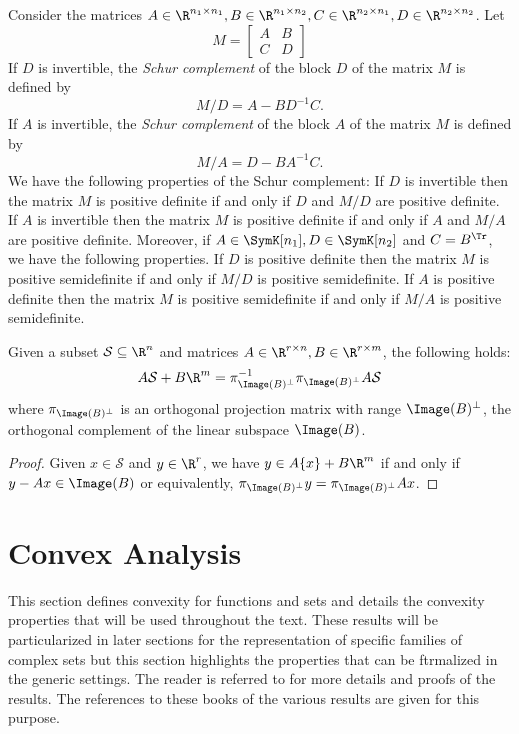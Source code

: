 \documentclass[11pt,twoside,a4paper,openright]{uclouvain-thesis}
\newcommand{\piB}{\pi_{\Image(B)^\perp}}
\newcommand{\piBinv}{\pi_{\Image(B)^\perp}^{-1}}
\begin{document}
\begin{myprop}
  \label{prop:schurcomp}
  Consider the matrices $A \in \R^{n_1 \times n_1},
  B \in \R^{n_1 \times n_2}, C \in \R^{n_2 \times n_1},
  D \in \R^{n_2 \times n_2}$.
  Let
  \[
    M = \begin{bmatrix}
      A & B\\
      C & D
    \end{bmatrix}
  \]
  If $D$ is invertible, the \emph{Schur complement} of the block $D$ of the matrix $M$ is defined by
  \[ M/D = A - B D^{-1} C. \]
  If $A$ is invertible, the \emph{Schur complement} of the block $A$ of the matrix $M$ is defined by
  \[ M/A = D - B A^{-1} C. \]
  We have the following properties of the Schur complement:
  If $D$ is invertible then the matrix $M$ is positive definite if and only if $D$ and $M/D$ are
  positive definite.
  If $A$ is invertible then the matrix $M$ is positive definite if and only if $A$ and $M/A$ are
  positive definite.
  Moreover, if $A \in \SymK[n_1], D \in \SymK[n_2]$ and $C = B^\Tr$,
  we have the following properties.
  If $D$ is positive definite then the matrix $M$ is positive semidefinite if and only if $M/D$ is
  positive semidefinite.
  If $A$ is positive definite then the matrix $M$ is positive semidefinite if and only if $M/A$ is
  positive semidefinite.
\end{myprop}

\begin{myprop}
  \label{prop:projB}
  Given a subset $\mathcal{S} \subseteq \R^n$ and
  matrices $A \in \R^{r \times n}, B \in \R^{r \times m}$, the following holds:
  \[ A \mathcal{S} + B \R^m = \piBinv{} \piB{} A \mathcal{S} \]
  where $\piB{}$ is an orthogonal projection matrix with range $\Image(B)^\perp$, the orthogonal complement of the linear subspace $\Image(B)$.
  \begin{proof}
    Given $x \in \mathcal{S}$ and $y \in \R^r$, we have $y \in A \{x\} + B \R^m$ if and only if $y - Ax \in \Image(B)$ or equivalently, $\piB y = \piB Ax$.
  \end{proof}
\end{myprop}


\section{Convex Analysis}
\label{sec:conv}

This section defines convexity for functions and sets and details the convexity properties that will be used throughout the text.
These results will be particularized in later sections for the representation of specific families of complex sets but
this section highlights the properties that can be ftrmalized in the generic settings.
The reader is referred to \cite{rockafellar2015convex, rockafellarvariational, schneider2013convex, hiriart2012fundamentals, ball1997elementary}
for more details and proofs of the results.
The references to these books of the various results are given for this purpose.
\end{document}
